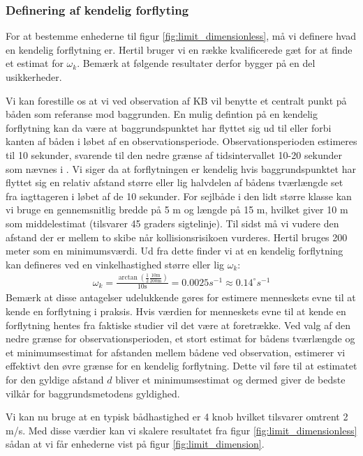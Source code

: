 \documentclass[%
 reprint,
nofootinbib,
aps,
]{revtex4-1}
\begin{document}
\subsubsection{Definering af kendelig forflyting}
For at bestemme enhederne til figur \ref{fig:limit_dimensionless}, må vi definere hvad en kendelig forflytning er. Hertil bruger vi en række kvalificerede gæt for at finde et estimat for $\omega_k$. Bemærk at følgende resultater derfor bygger på en del usikkerheder. \par
Vi kan forestille os at vi ved observation af KB vil benytte et centralt punkt på båden som referanse mod baggrunden. En mulig defintion på en kendelig forflytning kan da være at baggrundspunktet har flyttet sig ud til eller forbi kanten af båden i løbet af en observationsperiode. Observationsperioden estimeres til 10 sekunder, svarende til den nedre grænse af tidsintervallet 10-20 sekunder som nævnes i \cite{duelighed}. Vi siger da at forflytningen er kendelig hvis baggrundspunktet har flyttet sig en relativ afstand større eller lig halvdelen af bådens tværlængde set fra iagttageren i løbet af de 10 sekunder. For sejlbåde i den lidt større klasse kan vi bruge en gennemsnitlig bredde på 5 m og længde på 15 m, hvilket giver 10 m som middelestimat (tilsvarer 45 graders sigtelinje). Til sidst må vi vudere den afstand der er mellem to skibe når kollisionsrisikoen vurderes. Hertil bruges 200 meter som en minimumsværdi. Ud fra dette finder vi at en kendelig forflytning kan defineres ved en vinkelhastighed større eller lig $\omega_k$:
\begin{align}
  \omega_k = \frac{\arctan{(\frac{1}{2}\frac{10 \text{m}}{200 \text{m}})}}{10 \text{s}} = 0.0025 s^{-1} \approx  0.14^{\circ}s^{-1}
  \label{eq:omega_k}
\end{align}
Bemærk at disse antagelser udelukkende gøres for estimere menneskets evne til at kende en forflytning i praksis. Hvis værdien for menneskets evne til at kende en forflytning hentes fra faktiske studier vil det være at foretrække. Ved valg af den nedre grænse for observationsperioden, et stort estimat for bådens tværlængde og et minimumsestimat for afstanden mellem bådene ved observation, estimerer vi effektivt den øvre grænse for en kendelig forflytning. Dette vil føre til at estimatet for den gyldige afstand $d$ bliver et minimumsestimat og dermed giver de bedste vilkår for baggrundsmetodens gyldighed. \par
Vi kan nu bruge at en typisk bådhastighed er 4 knob hvilket tilsvarer omtrent 2 m/s. Med disse værdier kan vi skalere resultatet fra figur \ref{fig:limit_dimensionless} sådan at vi får enhederne vist på figur \ref{fig:limit_dimension}.
\end{document}
